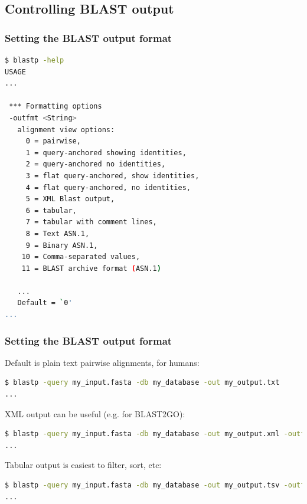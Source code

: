 \documentclass[table]{beamer}
\begin{document}
\subsection{Controlling BLAST output}

\begin{frame}[fragile]
\frametitle{Setting the BLAST output format}

\begin{lstlisting}[language=sh]
$ blastp -help
USAGE
...

 *** Formatting options
 -outfmt <String>
   alignment view options:
     0 = pairwise,
     1 = query-anchored showing identities,
     2 = query-anchored no identities,
     3 = flat query-anchored, show identities,
     4 = flat query-anchored, no identities,
     5 = XML Blast output,
     6 = tabular,
     7 = tabular with comment lines,
     8 = Text ASN.1,
     9 = Binary ASN.1,
    10 = Comma-separated values,
    11 = BLAST archive format (ASN.1)

   ...
   Default = `0'
...
\end{lstlisting}
\end{frame}


\begin{frame}[fragile]
\frametitle{Setting the BLAST output format}

Default is plain text pairwise alignments, for humans:

\begin{lstlisting}[language=sh]
$ blastp -query my_input.fasta -db my_database -out my_output.txt
...
\end{lstlisting}

XML output can be useful (e.g. for BLAST2GO):

\begin{lstlisting}[language=sh]
$ blastp -query my_input.fasta -db my_database -out my_output.xml -outfmt 5
...
\end{lstlisting}

Tabular output is easiest to filter, sort, etc:

\begin{lstlisting}[language=sh]
$ blastp -query my_input.fasta -db my_database -out my_output.tsv -outfmt 6
...
\end{lstlisting}
\end{frame}
\end{document}
